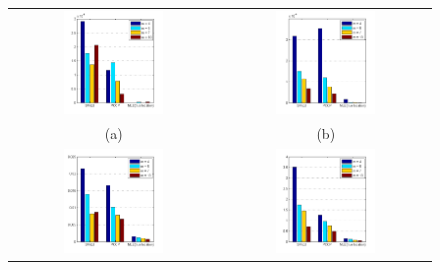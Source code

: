 \begin{figure}[t]
\centering
\begin{tabular}{cc}
 \includegraphics[width=0.5\textwidth,height =0.4\textheight]{figures/ccp/MSE_1e3}
 &
  \includegraphics[width=0.5\textwidth,height =0.4\textheight]{figures/ccp/MSE_1e2} 
  \\   (a)&  (b)   \\
 \includegraphics[width=0.5\textwidth,height =0.4\textheight]{figures/ccp/MSE_1e1}
&
  \includegraphics[width=0.5\textwidth,height =0.4\textheight]{figures/ccp/MSE_1e0} 

\end{tabular}
\end{figure}
